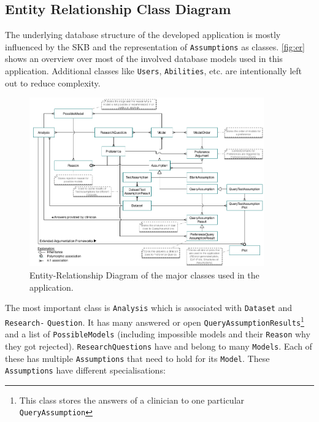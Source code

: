 \subsection{Entity Relationship Class Diagram }
\label{sub:db}


The underlying database structure of the developed application is mostly influenced by the \gls{SKB} and the representation of \texttt{Assumptions} as classes. \autoref{fig:er} shows an overview over most of the involved database models used in this application. Additional classes like \texttt{Users}, \texttt{Abilities}, etc. are intentionally left out to reduce complexity. 

\begin{figure}
	\centering
	\includegraphics[width=0.9\textwidth]{figures/er_complete}
	\caption{Entity-Relationship Diagram of the major classes used in the application. }
	\label{fig:er}
\end{figure}


The most important class is \texttt{Analysis} which is associated with \texttt{Dataset} and \texttt{Research-} \texttt{Question}. It has many answered or open \texttt{QueryAssumptionResults}\footnote{This class stores the answers of a clinician to one particular \texttt{QueryAssumption}} and a list of \texttt{PossibleModels} (including impossible models and their \texttt{Reason} why they got rejected). \texttt{ResearchQuestions} have and belong to many \texttt{Models}. Each of these has multiple \texttt{Assumptions} that need to hold for its \texttt{Model}. These \texttt{Assumptions} have different specialisations: 

\bigskip

